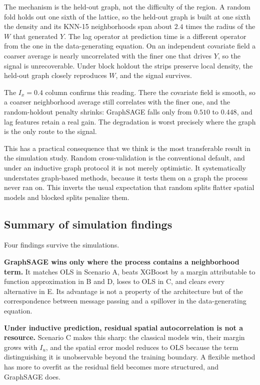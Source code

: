 \documentclass[ASNA, twocolumn]{USG} %
\begin{document}
The mechanism is the held-out graph, not the difficulty of the region. A random fold holds out one sixth of the lattice, so the held-out graph is built at one sixth the density and its KNN-15 neighborhoods span about \(2.4\) times the radius of the \(W\) that generated \(Y\). The lag operator at prediction time is a different operator from the one in the data-generating equation. On an independent covariate field a coarser average is nearly uncorrelated with the finer one that drives \(Y\), so the signal is unrecoverable. Under block holdout the strips preserve local density, the held-out graph closely reproduces \(W\), and the signal survives.

The \(I_x=0.4\) column confirms this reading. There the covariate field is smooth, so a coarser neighborhood average still correlates with the finer one, and the random-holdout penalty shrinks: GraphSAGE falls only from \(0.510\) to \(0.448\), and lag features retain a real gain. The degradation is worst precisely where the graph is the only route to the signal.

This has a practical consequence that we think is the most transferable result in the simulation study. Random cross-validation is the conventional default, and under an inductive graph protocol it is not merely optimistic. It systematically understates graph-based methods, because it tests them on a graph the process never ran on. This inverts the usual expectation that random splits flatter spatial models and blocked splits penalize them.

\subsection{Summary of simulation findings}

Four findings survive the simulations.

\textbf{GraphSAGE wins only where the process contains a neighborhood term.} It matches OLS in Scenario A, beats XGBoost by a margin attributable to function approximation in B and D, loses to OLS in C, and clears every alternative in E. Its advantage is not a property of the architecture but of the correspondence between message passing and a spillover in the data-generating equation.

\textbf{Under inductive prediction, residual spatial autocorrelation is not a resource.} Scenario C makes this sharp: the classical models win, their margin grows with \(I_u\), and the spatial error model reduces to OLS because the term distinguishing it is unobservable beyond the training boundary. A flexible method has more to overfit as the residual field becomes more structured, and GraphSAGE does.
\end{document}
